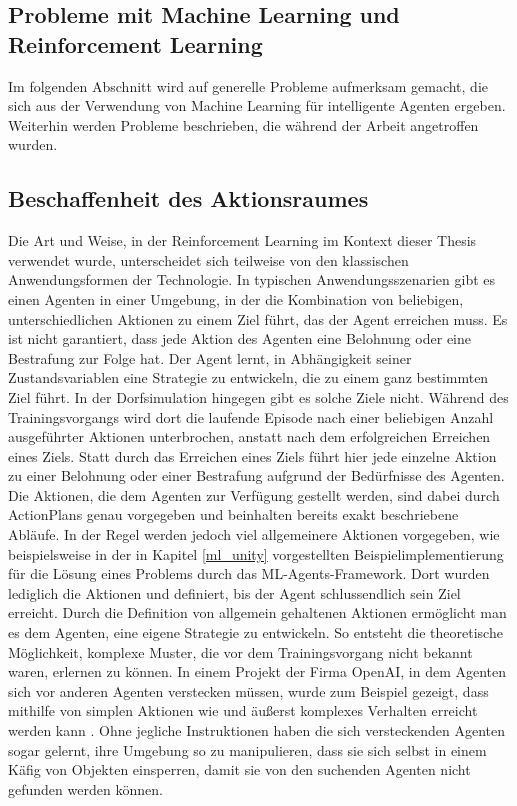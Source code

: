 \subsection{Probleme mit Machine Learning und Reinforcement Learning}
Im folgenden Abschnitt wird auf generelle Probleme aufmerksam gemacht, die sich aus der Verwendung von Machine Learning für intelligente Agenten ergeben. Weiterhin werden Probleme beschrieben, die während der Arbeit angetroffen wurden.

\subsection{Beschaffenheit des Aktionsraumes}\label{allgemeine_aktionen}
Die Art und Weise, in der Reinforcement Learning im Kontext dieser Thesis verwendet wurde, unterscheidet sich teilweise von den klassischen Anwendungsformen der Technologie. In typischen Anwendungsszenarien gibt es einen Agenten in einer Umgebung, in der die Kombination von beliebigen, unterschiedlichen Aktionen zu einem Ziel führt, das der Agent erreichen muss. Es ist nicht garantiert, dass jede Aktion des Agenten eine Belohnung oder eine Bestrafung zur Folge hat. Der Agent lernt, in Abhängigkeit seiner Zustandsvariablen eine Strategie zu entwickeln, die zu einem ganz bestimmten Ziel führt. In der Dorfsimulation hingegen gibt es solche Ziele nicht. Während des Trainingsvorgangs wird dort die laufende Episode nach einer beliebigen Anzahl ausgeführter Aktionen unterbrochen, anstatt nach dem erfolgreichen Erreichen eines Ziels. Statt durch das Erreichen eines Ziels führt hier jede einzelne Aktion zu einer Belohnung oder einer Bestrafung aufgrund der Bedürfnisse des Agenten. Die Aktionen, die dem Agenten zur Verfügung gestellt werden, sind dabei durch ActionPlans genau vorgegeben und beinhalten bereits exakt beschriebene Abläufe. In der Regel werden jedoch viel allgemeinere Aktionen vorgegeben, wie beispielsweise in der in Kapitel \ref{ml_unity} vorgestellten Beispielimplementierung für die Lösung eines Problems durch das ML-Agents-Framework. Dort wurden lediglich die Aktionen  und  definiert, bis der Agent schlussendlich sein Ziel erreicht. Durch die Definition von allgemein gehaltenen Aktionen ermöglicht man es dem Agenten, eine eigene Strategie zu entwickeln. So entsteht die theoretische Möglichkeit, komplexe Muster, die vor dem Trainingsvorgang nicht bekannt waren, erlernen zu können. In einem Projekt der Firma OpenAI, in dem Agenten sich vor anderen Agenten verstecken müssen, wurde zum Beispiel gezeigt, dass mithilfe von simplen Aktionen wie  und  äußerst komplexes Verhalten erreicht werden kann \cite{hide_and_seek_openai} \cite{hide_and_seek_openai_paper}. Ohne jegliche Instruktionen haben die sich versteckenden Agenten sogar gelernt, ihre Umgebung so zu manipulieren, dass sie sich selbst in einem Käfig von Objekten einsperren, damit sie von den suchenden Agenten nicht gefunden werden können. 
